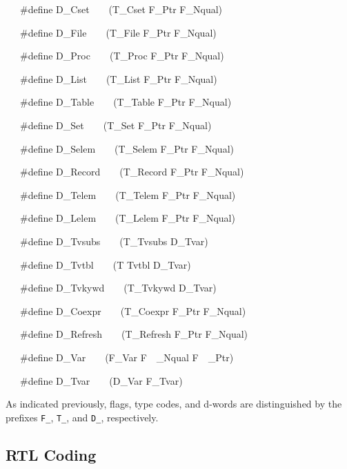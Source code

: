 {\ttfamily\mdseries
\ \ \ \#define D\_Cset\ \ \ \ (T\_Cset {\textbar} F\_Ptr {\textbar} F\_Nqual)}

{\ttfamily\mdseries
\ \ \ \#define D\_File\ \ \ \ (T\_File {\textbar} F\_Ptr {\textbar} F\_Nqual)}

{\ttfamily\mdseries
\ \ \ \#define D\_Proc\ \ \ \ (T\_Proc {\textbar} F\_Ptr {\textbar} F\_Nqual)}

{\ttfamily\mdseries
\ \ \ \#define D\_List\ \ \ \ (T\_List {\textbar} F\_Ptr {\textbar} F\_Nqual)}

{\ttfamily\mdseries
\ \ \ \#define D\_Table\ \ \ \ (T\_Table {\textbar} F\_Ptr {\textbar} F\_Nqual)}

{\ttfamily\mdseries
\ \ \ \#define D\_Set\ \ \ \ (T\_Set {\textbar} F\_Ptr {\textbar} F\_Nqual)}

{\ttfamily\mdseries
\ \ \ \#define D\_Selem\ \ \ \ (T\_Selem {\textbar} F\_Ptr {\textbar} F\_Nqual)}

{\ttfamily\mdseries
\ \ \ \#define D\_Record\ \ \ \ (T\_Record {\textbar} F\_Ptr {\textbar} F\_Nqual)}

{\ttfamily\mdseries
\ \ \ \#define D\_Telem\ \ \ \ (T\_Telem {\textbar} F\_Ptr {\textbar} F\_Nqual)}

{\ttfamily\mdseries
\ \ \ \#define D\_Lelem\ \ \ \ (T\_Lelem {\textbar} F\_Ptr {\textbar} F\_Nqual)}

{\ttfamily\mdseries
\ \ \ \#define D\_Tvsubs\ \ \ \ (T\_Tvsubs {\textbar} D\_Tvar)}

{\ttfamily\mdseries
\ \ \ \#define D\_Tvtbl\ \ \ \ (T Tvtbl {\textbar} D\_Tvar)}

{\ttfamily\mdseries
\ \ \ \#define D\_Tvkywd\ \ \ \ (T\_Tvkywd {\textbar} D\_Tvar)}

{\ttfamily\mdseries
\ \ \ \#define D\_Coexpr\ \ \ \ (T\_Coexpr {\textbar} F\_Ptr {\textbar} F\_Nqual)}

{\ttfamily\mdseries
\ \ \ \#define D\_Refresh\ \ \ \ (T\_Refresh {\textbar} F\_Ptr {\textbar} F\_Nqual)}

{\ttfamily\mdseries
\ \ \ \#define D\_Var\ \ \ \ (F\_Var {\textbar} F\ \ \_Nqual {\textbar} F\ \ \_Ptr)}

{\ttfamily\mdseries
\ \ \ \#define D\_Tvar\ \ \ \ (D\_Var {\textbar} F\_Tvar)}

As indicated previously, flags, type codes, and d-words are
distinguished by the prefixes \texttt{F\_}, \texttt{T\_}, and
\texttt{D\_}, respectively.

\subsection{RTL Coding}

